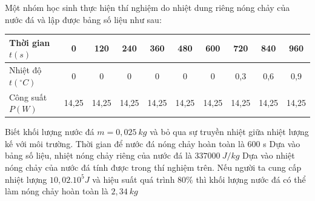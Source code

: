 \begin{ex}
	Một nhóm học sinh thực hiện thí nghiệm do nhiệt dung riêng nóng chảy của nước đá và lập được bảng số liệu như sau:
	
	\begin{center}
		\begin{tabular}{|l|c|c|c|c|c|c|c|c|c|}
			\hline
			Thời gian $t(s)$ & 0 & 120 & 240 & 360 & 480 & 600 & 720 & 840 & 960 \\
			\hline
			Nhiệt độ $t \left({ }^\circ C\right)$ & 0 & 0 & 0 & 0 & 0 & 0 & 0,3 & 0,6 & 0,9 \\
			\hline
			Công suất $P(W)$ & 14,25 & 14,25 & 14,25 & 14,25 & 14,25 & 14,25 & 14,25 & 14,25 & 14,25 \\
			\hline
		\end{tabular}
	\end{center}
	Biết khối lượng nước đá $m=0,025\ kg$ và bỏ qua sự truyền nhiệt giữa nhiệt lượng kế với môi trường.
	{\True Thời gian để nước đá nóng chảy hoàn toàn là 600 s}
	{Dựa vào bảng số liệu, nhiệt nóng chảy riêng của nước đá là $337000\ J/kg$}
	{\True Dựa vào nhiệt nóng chảy của nước đá tính được trong thí nghiệm trên. Nếu người ta cung cấp nhiệt lượng $10,02.10^5 J$ và hiệu suất quá trình $80 \%$ thì khối lượng nước đá có thể làm nóng chảy hoàn toàn là $2,34\ kg$}
\end{ex}

